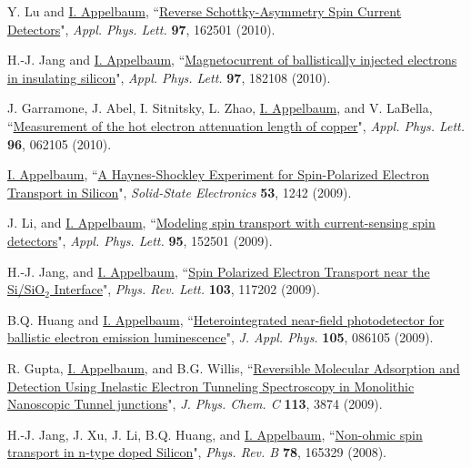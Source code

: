 \documentclass[paper=letter,fontsize=11pt]{scrartcl} %
\newcommand{\PaperEntry}[7]{
		\noindent #1, ``\href{#7}{#2}", \textit{#3} \textbf{#4}, #5 (#6).}
\begin{document}
\begin{etaremune}
\item\PaperEntry{Y. Lu and \underline{I. Appelbaum}}{Reverse Schottky-Asymmetry Spin Current Detectors}{Appl. Phys. Lett.}{97}{162501}{2010}{http://dx.doi.org/10.1063/1.3504659}

\item\PaperEntry{H.-J. Jang and \underline{I. Appelbaum}}{Magnetocurrent of ballistically injected electrons in insulating silicon}{Appl. Phys. Lett.}{97}{182108}{2010}{http://dx.doi.org/10.1063/1.3511681}

\item\PaperEntry{J. Garramone, J. Abel, I. Sitnitsky, L. Zhao, \underline{I. Appelbaum}, and V. LaBella}{Measurement of the hot electron attenuation length of copper}{Appl. Phys. Lett.}{96}{062105}{2010}{http://dx.doi.org/10.1063/1.3299712}

\item\PaperEntry{\underline{I. Appelbaum}}{A Haynes-Shockley Experiment for Spin-Polarized Electron Transport in Silicon}{Solid-State Electronics}{53}{1242}{2009}{http://dx.doi.org/10.1016/j.sse.2009.09.012}

\item\PaperEntry{J. Li, and \underline{I. Appelbaum}}{Modeling spin transport with current-sensing spin detectors}{Appl. Phys. Lett.}{95}{152501}{2009}{http://dx.doi.org/10.1063/1.3241080}

\item\PaperEntry{H.-J. Jang, and \underline{I. Appelbaum}}{Spin Polarized Electron Transport near the Si/SiO$_2$ Interface}{Phys. Rev. Lett.}{103}{117202}{2009}{http://dx.doi.org/10.1103/PhysRevLett.103.117202}

\item\PaperEntry{B.Q. Huang and \underline{I. Appelbaum}}{Heterointegrated near-field photodetector for ballistic electron emission luminescence}{J. Appl. Phys.}{105}{086105}{2009}{http://dx.doi.org/10.1063/1.3116507}

\item\PaperEntry{R. Gupta, \underline{I. Appelbaum}, and B.G. Willis}{Reversible Molecular Adsorption and Detection Using Inelastic Electron Tunneling Spectroscopy in Monolithic Nanoscopic Tunnel junctions}{J. Phys. Chem. C}{113}{3874}{2009}{http://dx.doi.org/10.1021/jp806074f}

\item\PaperEntry{H.-J. Jang, J. Xu, J. Li, B.Q. Huang, and \underline{I. Appelbaum}}{Non-ohmic spin transport in n-type doped Silicon}{Phys. Rev. B}{78}{165329}{2008}{http://dx.doi.org/10.1103/PhysRevB.78.165329}


\end{etaremune}
\end{document}
